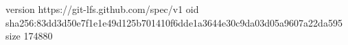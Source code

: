 version https://git-lfs.github.com/spec/v1
oid sha256:83dd3d50e7f1e1e49d125b701410f6dde1a3644e30c9da03d05a9607a22da595
size 174880
